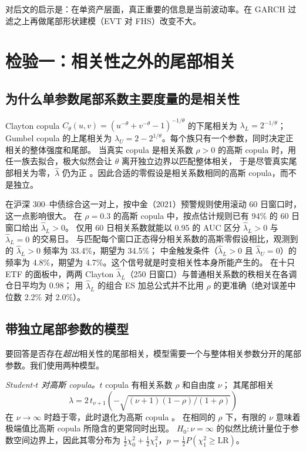 \documentclass[11pt,UTF8]{ctexart}
\newcommand{\1}{\mathbf{1}}
\begin{document}


对后文的启示是：在单资产层面，真正重要的信息是当前波动率。在 GARCH 过滤之上再做尾部形状建模（EVT 对 FHS）改变不大。

\section{检验一：相关性之外的尾部相关}
\label{sec:test1}

\subsection{为什么单参数尾部系数主要度量的是相关性}

Clayton copula $C_\theta(u,v) = (u^{-\theta}+v^{-\theta}-1)^{-1/\theta}$ 的下尾相关为 $\lambda_L = 2^{-1/\theta}$；
Gumbel copula 的上尾相关为 $\lambda_U = 2-2^{1/\theta}$。每个族只有一个参数，同时决定正相关的整体强度和尾部。
当真实 copula 是相关系数 $\rho>0$ 的高斯 copula 时，用任一族去拟合，极大似然会让 $\theta$ 离开独立边界以匹配整体相关，
于是尽管真实尾部相关为零，$\hat\lambda$ 仍为正 \citep{joe1997}。因此合适的零假设是相关系数相同的高斯 copula，而不是独立。

在沪深 300--中债综合这一对上，按中金（2021）预警规则使用滚动 60 日窗口时，这一点影响很大。
在 $\rho=0.3$ 的高斯 copula 中，按点估计规则已有 94\% 的 60 日窗口给出 $\hat\lambda_L>0$。
仅用 60 日相关系数就能以 0.95 的 AUC 区分 $\hat\lambda_L>0$ 与 $\hat\lambda_L=0$ 的交易日。
与匹配每个窗口正态得分相关系数的高斯零假设相比，观测到的 $\hat\lambda_L>0$ 频率为 33.4\%，期望为 34.5\%；
中金触发条件（$\hat\lambda_L>0$ 且 $\hat\lambda_U=0$）的频率为 4.8\%，期望为 4.7\%。这个信号就是时变相关性本身所能产生的。
在十只 ETF 的面板中，两两 Clayton $\hat\lambda_L$（250 日窗口）与普通相关系数的秩相关在各调仓日平均为 0.98；
用 $\hat\lambda_L$ 的组合 ES 加总公式并不比用 $\rho$ 的更准确（绝对误差中位数 2.2\% 对 2.0\%）。

\subsection{带独立尾部参数的模型}

要回答是否存在\emph{超出}相关性的尾部相关，模型需要一个与整体相关参数分开的尾部参数。我们使用两种模型。

\emph{Student-$t$ 对高斯 copula。}$t$ copula 有相关系数 $\rho$ 和自由度 $\nu$；
其尾部相关
\[
\lambda = 2\,t_{\nu+1}\!\left(-\sqrt{(\nu+1)(1-\rho)/(1+\rho)}\right)
\]
在 $\nu\to\infty$ 时趋于零，此时退化为高斯 copula \citep{demarta2005}。
在相同的 $\rho$ 下，有限的 $\nu$ 意味着极端值比高斯 copula 所隐含的更常同时出现。
$H_0:\nu=\infty$ 的似然比统计量位于参数空间边界上，因此其零分布为 $\tfrac12\chi^2_0+\tfrac12\chi^2_1$，$p=\tfrac12 P(\chi^2_1\ge \mathrm{LR})$。
\end{document}
